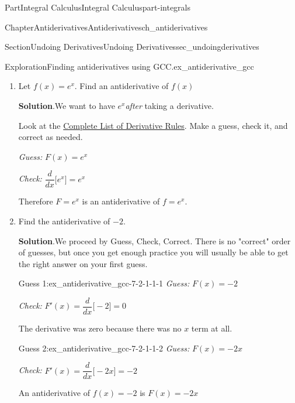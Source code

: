 \documentclass{tufte-book}
\newcommand{\blocktitlefont}{\relax}
\newcommand{\alert}[1]{\textbf{\textit{#1}}}
\numberwithin{equation}{chapter}
\newcommand{\ddx}[1]{ \dfrac{d}{dx} \Big[ #1 \Big]  }
\begin{document}
\begin{partptx}{Part}{Integral Calculus}{}{Integral Calculus}{}{}{part-integrals}
\begin{chapterptx}{Chapter}{Antiderivatives}{}{Antiderivatives}{}{}{ch_antiderivatives}
\begin{sectionptx}{Section}{Undoing Derivatives}{}{Undoing Derivatives}{}{}{sec_undoingderivatives}
\begin{exploration}{Exploration}{Finding antiderivatives using GCC.}{ex_antiderivative_gcc}
\begin{enumerate}[font=\bfseries,label=(\alph*),ref=\alph*]
\par
Look at the \hyperref[assemblage-derivativesummary]{Complete List of Derivative Rules}. Make a guess, check it, and correct as needed.%
\par
\emph{Guess:} \(F(x) = \ln(x)\)%
\par
\emph{Check:} \(\ddx{\ln(x)} = \frac{1}{x}\)%
\par
\alert{Important:} For technical reasons beyond the scope of this course, we actually need to place absolute values around the input to \(\ln(x)\)%
\par
Therefore \(F= \ln(|x|)\) is an antiderivative of \(f=\frac{1}{x}\).%
\item{}Let \(f(x) = e^x\).  Find an antiderivative of \(f(x)\)%
\par\smallskip%
\noindent\textbf{\blocktitlefont Solution}.\hypertarget{ex_antiderivative_gcc-6-2}{}\quad{}We want to have \(e^x\)\emph{after} taking a derivative.%
\par
Look at the \hyperref[assemblage-derivativesummary]{Complete List of Derivative Rules}. Make a guess, check it, and correct as needed.%
\par
\emph{Guess:} \(F(x) = e^x\)%
\par
\emph{Check:} \(\ddx{ e^x } = e^x \)%
\par
Therefore \(F= e^x \) is an antiderivative of \(f=e^x \).%
\item{}Find the antiderivative of \(-2\).%
\par\smallskip%
\noindent\textbf{\blocktitlefont Solution}.\hypertarget{ex_antiderivative_gcc-7-2}{}\quad{}We proceed by Guess, Check, Correct. There is no "correct" order of guesses, but once you get enough practice you will usually be able to get the right answer on your first guess.%
\begin{descriptionlist}
\begin{dlimedium}{Guess 1:}{ex_antiderivative_gcc-7-2-1-1-1}%
\emph{Guess:} \(F(x) = -2\)%
\par
\emph{Check:} \(F'(x) = \ddx{-2} = 0\)%
\par
The derivative was zero because there was no \(x\) term at all.%
\end{dlimedium}%
\begin{dlimedium}{Guess 2:}{ex_antiderivative_gcc-7-2-1-1-2}%
\emph{Guess:} \(F(x) = -2x\)%
\par
\emph{Check:} \(F'(x) = \ddx{-2x} = -2\)%
\par
An antiderivative of \(f(x)=-2\) is \(F(x)=-2x\)%
\end{dlimedium}%

\end{descriptionlist}
\end{enumerate}
\end{exploration}
\end{sectionptx}
\end{chapterptx}
\end{partptx}
\end{document}
